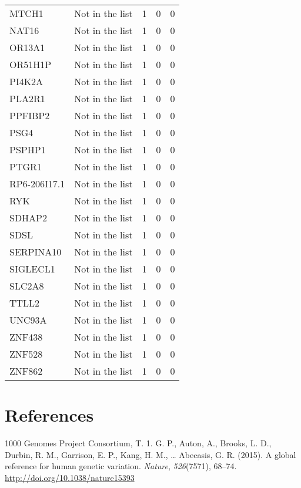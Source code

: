 \documentclass[12pt,twoside]{reedthesis}
\theoremstyle{definition}
\theoremstyle{definition}
\theoremstyle{remark}
\begin{document}
\begin{longtable}[t]{llrrr}
  MTCH1 & Not in the list & 1 & 0 & 0\\
  NAT16 & Not in the list & 1 & 0 & 0\\
  \addlinespace
  OR13A1 & Not in the list & 1 & 0 & 0\\
  OR51H1P & Not in the list & 1 & 0 & 0\\
  PI4K2A & Not in the list & 1 & 0 & 0\\
  PLA2R1 & Not in the list & 1 & 0 & 0\\
  PPFIBP2 & Not in the list & 1 & 0 & 0\\
  \addlinespace
  PSG4 & Not in the list & 1 & 0 & 0\\
  PSPHP1 & Not in the list & 1 & 0 & 0\\
  PTGR1 & Not in the list & 1 & 0 & 0\\
  RP6-206I17.1 & Not in the list & 1 & 0 & 0\\
  RYK & Not in the list & 1 & 0 & 0\\
  \addlinespace
  SDHAP2 & Not in the list & 1 & 0 & 0\\
  SDSL & Not in the list & 1 & 0 & 0\\
  SERPINA10 & Not in the list & 1 & 0 & 0\\
  SIGLECL1 & Not in the list & 1 & 0 & 0\\
  SLC2A8 & Not in the list & 1 & 0 & 0\\
  \addlinespace
  TTLL2 & Not in the list & 1 & 0 & 0\\
  UNC93A & Not in the list & 1 & 0 & 0\\
  ZNF438 & Not in the list & 1 & 0 & 0\\
  ZNF528 & Not in the list & 1 & 0 & 0\\
  ZNF862 & Not in the list & 1 & 0 & 0\\
  \bottomrule
  \end{longtable}
  
  \backmatter
  
  \chapter*{References}\label{references}
  
  \noindent
  
  \setlength{\parindent}{-0.20in} \setlength{\leftskip}{0.20in}
  \setlength{\parskip}{8pt}
  
  \hypertarget{refs}{}
  \hypertarget{ref-1000GenomesProjectConsortium2015}{}
  1000 Genomes Project Consortium, T. 1. G. P., Auton, A., Brooks, L. D.,
  Durbin, R. M., Garrison, E. P., Kang, H. M., \ldots{} Abecasis, G. R.
  (2015). A global reference for human genetic variation. \emph{Nature},
  \emph{526}(7571), 68--74. \url{http://doi.org/10.1038/nature15393}
  
\end{document}

